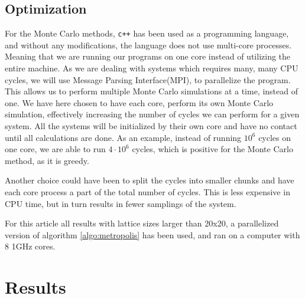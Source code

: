 \documentclass[%
reprint,
nofootinbib,
amsmath,amssymb,
aps,
]{revtex4-1}
\begin{document}
\subsection{Optimization}%
For the Monte Carlo methods, \texttt{c++} has been used as a programming language, and without any modifications, the language does not use multi-core processes. Meaning that we are running our programs on one core instead of utilizing the entire machine. As we are dealing with systems which requires many, many CPU cycles, we will use Message Parsing Interface(MPI), to parallelize the program. This allows us to perform multiple Monte Carlo simulations at a time, instead of one. We have here chosen to have each core, perform its own Monte Carlo simulation, effectively increasing the number of cycles we can perform for a given system. All the systems will be initialized by their own core and have no contact until all calculations are done. As an example, instead of running $10^6$ cycles on one core, we are able to run $4\cdot 10^6$ cycles, which is positive for the Monte Carlo method, as it is greedy. 

Another choice could have been to split the cycles into smaller chunks and have each core process a part of the total number of cycles. This is less expensive in CPU time, but in turn results in fewer samplings of the system.  

For this article all results with lattice sizes larger than 20x20, a parallelized version of algorithm \ref{algo:metropolis} has been used, and ran on a computer with 8 1GHz cores. 
\section{Results}%
\end{document}
